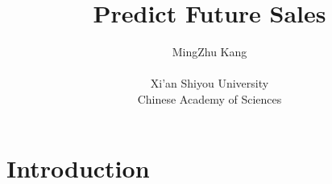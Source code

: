 \documentclass[
 size=14pt,
 paper=smartboard,  %
 mode=present, 		%
 display=slides, 	%
 style=tuliplab,  	%
 pauseslide,
 fleqn,leqno]{powerdot}
\title{Predict Future Sales}
\author{
MingZhu Kang 
\\
\\Xi'an Shiyou University
\\Chinese Academy of Sciences
}
\begin{document}
\maketitle





\section{Introduction}
\end{document}
